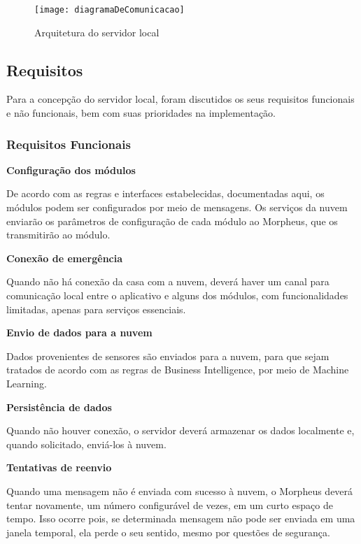\begin{figure}
	\centering
	\caption{Arquitetura do servidor local}
  \texttt{[image: diagramaDeComunicacao]}
\label{fig:diagramaDeComunicacao}
\end{figure}

\subsection{Requisitos}
Para a concepção do servidor local, foram discutidos os seus requisitos funcionais e não funcionais, bem com suas prioridades na implementação.

\subsubsection{Requisitos Funcionais}
\begin{description}

\item \textbf{Configuração dos módulos}

De acordo com as regras e interfaces estabelecidas, documentadas aqui, os módulos podem ser configurados por meio de mensagens. Os serviços da nuvem enviarão os parâmetros de configuração de cada módulo ao Morpheus, que os transmitirão ao módulo.

\item \textbf{Conexão de emergência}

Quando não há conexão da casa com a nuvem, deverá haver um canal para comunicação local entre o aplicativo e alguns dos módulos, com funcionalidades limitadas, apenas para serviços essenciais.

\item \textbf{Envio de dados para a nuvem}

Dados provenientes de sensores são enviados para a nuvem, para que sejam tratados de acordo com as regras de Business Intelligence, por meio de Machine Learning.

\item \textbf{Persistência de dados}

Quando não houver conexão, o servidor deverá armazenar os dados localmente e, quando solicitado, enviá-los à nuvem.

\item \textbf{Tentativas de reenvio}

Quando uma mensagem não é enviada com sucesso à nuvem, o Morpheus deverá tentar novamente, um número configurável de vezes, em um
curto espaço de tempo. Isso ocorre pois, se determinada mensagem não pode ser enviada em uma janela temporal, ela perde o seu sentido, mesmo por questões de segurança.


\end{description}
